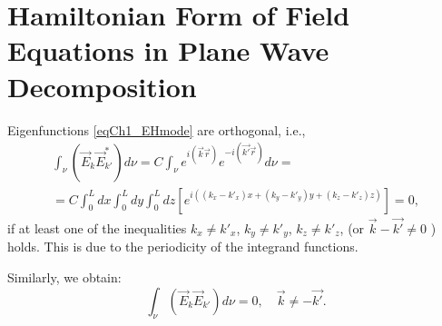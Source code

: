 \section{Hamiltonian Form of Field Equations in Plane Wave Decomposition}
Eigenfunctions \eqref{eqCh1_EHmode} are orthogonal, i.e.,
\begin{eqnarray}
\int_{\nu} \left( \vec{E}_k \vec{E}_{k'}^{*} \right) d \nu =
C \int_{\nu} e^{i \left(\vec{k}\vec{r}\right)} e^{- i
  \left(\vec{k'}\vec{r}\right)} d \nu =
\nonumber \\
= C \int_0^L d x \int_0^L d y \int_0^L d z
\left[ e^{i\left(
\left(k_x - k'_x\right) x +
\left(k_y - k'_y\right) y +
\left(k_z - k'_z\right) z
\right)}
\right] = 0,
\end{eqnarray}
if at least one of the inequalities
$k_x \ne k'_x$,
$k_y \ne k'_y$,
$k_z \ne k'_z$,
(or
$\vec{k} - \vec{k'} \ne 0$
) holds. This is due to the periodicity of the integrand functions.

Similarly, we obtain:
\begin{equation}
\int_{\nu} \left( \vec{E}_k \vec{E}_{k'} \right) d \nu = 0,
\quad
\vec{k} \ne - \vec{k'}.
\end{equation}

